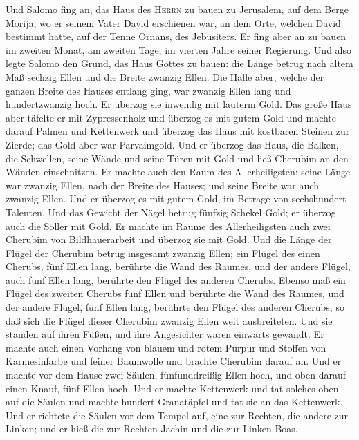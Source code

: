  Und Salomo fing an, das Haus des \textsc{Herrn} zu bauen
zu Jerusalem, auf dem Berge Morija, wo er seinem Vater David erschienen
war, an dem Orte, welchen David bestimmt hatte, auf der Tenne Ornans,
des Jebusiters.  Er fing aber an zu bauen im zweiten
Monat, am zweiten Tage, im vierten Jahre seiner Regierung.
 Und also legte Salomo den Grund, das Haus Gottes zu
bauen: die Länge betrug nach altem Maß sechzig Ellen und die Breite
zwanzig Ellen.  Die Halle aber, welche der ganzen Breite
des Hauses entlang ging, war zwanzig Ellen lang und hundertzwanzig hoch.
Er überzog sie inwendig mit lauterm Gold.  Das große Haus
aber täfelte er mit Zypressenholz und überzog es mit gutem Gold und
machte darauf Palmen und Kettenwerk  und überzog das Haus
mit kostbaren Steinen zur Zierde; das Gold aber war Parvaimgold.
 Und er überzog das Haus, die Balken, die Schwellen, seine
Wände und seine Türen mit Gold und ließ Cherubim an den Wänden
einschnitzen.  Er machte auch den Raum des
Allerheiligsten: seine Länge war zwanzig Ellen, nach der Breite des
Hauses; und seine Breite war auch zwanzig Ellen. Und er überzog es mit
gutem Gold, im Betrage von sechshundert Talenten.  Und das
Gewicht der Nägel betrug fünfzig Schekel Gold; er überzog auch die
Söller mit Gold.  Er machte im Raume des Allerheiligsten
auch zwei Cherubim von Bildhauerarbeit und überzog sie mit Gold.
 Und die Länge der Flügel der Cherubim betrug insgesamt
zwanzig Ellen; ein Flügel des einen Cherubs, fünf Ellen lang, berührte
die Wand des Raumes, und der andere Flügel, auch fünf Ellen lang,
berührte den Flügel des anderen Cherubs.  Ebenso maß ein
Flügel des zweiten Cherubs fünf Ellen und berührte die Wand des Raumes,
und der andere Flügel, fünf Ellen lang, berührte den Flügel des anderen
Cherubs,  so daß sich die Flügel dieser Cherubim zwanzig
Ellen weit ausbreiteten. Und sie standen auf ihren Füßen, und ihre
Angesichter waren einwärts gewandt.  Er machte auch einen
Vorhang von blauem und rotem Purpur und Stoffen von Karmesinfarbe und
feiner Baumwolle und brachte Cherubim darauf an.  Und er
machte vor dem Hause zwei Säulen, fünfunddreißig Ellen hoch, und oben
darauf einen Knauf, fünf Ellen hoch.  Und er machte
Kettenwerk und tat solches oben auf die Säulen und machte hundert
Granatäpfel und tat sie an das Kettenwerk.  Und er
richtete die Säulen vor dem Tempel auf, eine zur Rechten, die andere zur
Linken; und er hieß die zur Rechten Jachin und die zur Linken Boas.

